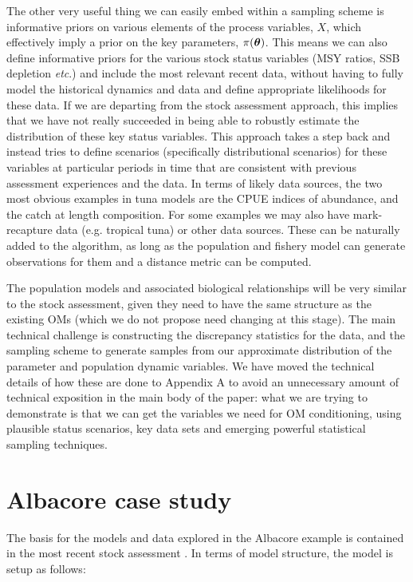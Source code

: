 \documentclass[12pt,a4paper,twoside,times,sky,standard]{csiroreport2017}
\newcommand{\xtheta}{\mbox{\boldmath$\theta$}}
\begin{document}
The other very useful thing we can easily embed within a sampling scheme is informative priors on various elements of the process variables, $X$, which effectively imply a prior on the key parameters, $\pi(\xtheta)$. This means we can also define informative priors for the various stock status variables (MSY ratios, SSB depletion \textit{etc}.) and include the most relevant recent data, without having to fully model the historical dynamics and data and define appropriate likelihoods for these data. If we are departing from the stock assessment approach, this implies that we have not really succeeded in being able to robustly estimate the distribution of these key status variables. This approach takes a step back and instead tries to define scenarios (specifically distributional scenarios) for these variables at particular periods in time that are consistent with previous assessment experiences and the data. In terms of likely data sources, the two most obvious examples in tuna models are the CPUE indices of abundance, and the catch at length composition. For some examples we may also have mark-recapture data (e.g. tropical tuna) or other data sources. These can be naturally added to the algorithm, as long as the population and fishery model can generate observations for them and a distance metric can be computed.

The population models and associated biological relationships will be very similar to the stock assessment, given they need to have the same structure as the existing OMs (which we do not propose need changing at this stage). The main technical challenge is constructing the discrepancy statistics for the data, and the sampling scheme to generate samples from our approximate distribution of the parameter and population dynamic variables. We have moved the technical details of how these are done to Appendix A to avoid an unnecessary amount of technical exposition in the main body of the paper: what we are trying to demonstrate is that we can get the variables we need for OM conditioning, using plausible status scenarios, key data sets and emerging powerful statistical sampling techniques.

\section{Albacore case study}

The basis for the models and data explored in the Albacore example is contained in the most recent stock assessment \cite{albsa}. In terms of model structure, the model is setup as follows:
\end{document}

